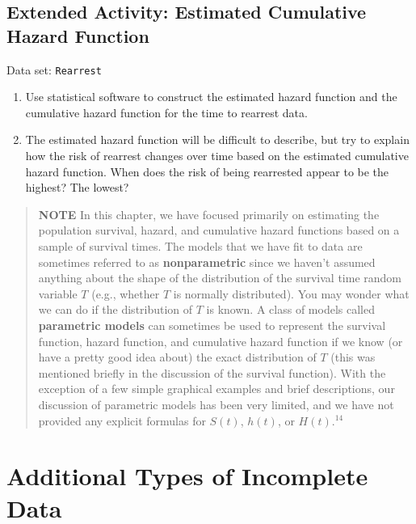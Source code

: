 \documentclass[
]{book}
\begin{document}
\hypertarget{extended-activity-estimated-cumulative-hazard-function}{%
\subsection*{Extended Activity: Estimated Cumulative Hazard Function}\label{extended-activity-estimated-cumulative-hazard-function}}

Data set: \texttt{Rearrest}

\begin{enumerate}
\def\labelenumi{\arabic{enumi}.}
\setcounter{enumi}{48}
\item
  Use statistical software to construct the estimated hazard function and the cumulative hazard function for the time to rearrest data.
\item
  The estimated hazard function will be difficult to describe, but try to explain how the risk of rearrest changes over time based on the estimated cumulative hazard function. When does the risk of being rearrested appear to be the highest? The lowest?
\end{enumerate}

\begin{quote}
\textbf{NOTE}
In this chapter, we have focused primarily on estimating the population survival, hazard, and cumulative hazard functions based on a sample of survival times. The models that we have fit to data are sometimes referred to as \textbf{nonparametric} since we haven't assumed anything about the shape of the distribution of the survival time random variable \(T\) (e.g., whether \(T\) is normally distributed). You may wonder what we can do if the distribution of \(T\) is known. A class of models called \textbf{parametric models} can sometimes be used to represent the survival function, hazard function, and cumulative hazard function if we know (or have a pretty good idea about) the exact distribution of \(T\) (this was mentioned briefly in the discussion of the survival function). With the exception of a few simple graphical examples and brief descriptions, our discussion of parametric models has been very limited, and we have not provided any explicit formulas for \(S(t)\), \(h(t)\), or \(H(t)\).\(^{14}\)
\end{quote}

\hypertarget{additional-types-of-incomplete-data}{%
\section{Additional Types of Incomplete Data}\label{additional-types-of-incomplete-data}}
\end{document}
